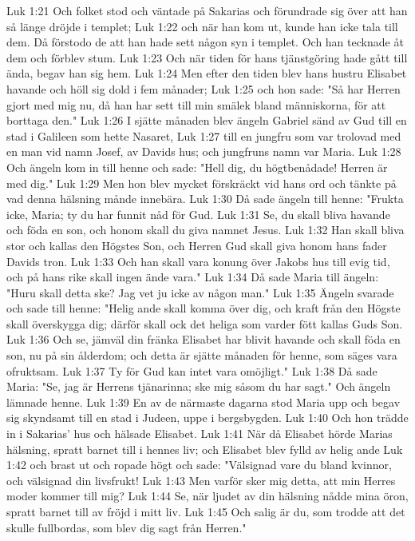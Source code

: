 Luk 1:21  Och folket stod och väntade på Sakarias och förundrade sig över att han så länge dröjde i templet;
Luk 1:22  och när han kom ut, kunde han icke tala till dem. Då förstodo de att han hade sett någon syn i templet. Och han tecknade åt dem och förblev stum.
Luk 1:23  Och när tiden för hans tjänstgöring hade gått till ända, begav han sig hem.
Luk 1:24  Men efter den tiden blev hans hustru Elisabet havande och höll sig dold i fem månader;
Luk 1:25  och hon sade: "Så har Herren gjort med mig nu, då han har sett till min smälek bland människorna, för att borttaga den."
Luk 1:26  I sjätte månaden blev ängeln Gabriel sänd av Gud till en stad i Galileen som hette Nasaret,
Luk 1:27  till en jungfru som var trolovad med en man vid namn Josef, av Davids hus; och jungfruns namn var Maria.
Luk 1:28  Och ängeln kom in till henne och sade: "Hell dig, du högtbenådade! Herren är med dig."
Luk 1:29  Men hon blev mycket förskräckt vid hans ord och tänkte på vad denna hälsning månde innebära.
Luk 1:30  Då sade ängeln till henne: "Frukta icke, Maria; ty du har funnit nåd för Gud.
Luk 1:31  Se, du skall bliva havande och föda en son, och honom skall du giva namnet Jesus.
Luk 1:32  Han skall bliva stor och kallas den Högstes Son, och Herren Gud skall giva honom hans fader Davids tron.
Luk 1:33  Och han skall vara konung över Jakobs hus till evig tid, och på hans rike skall ingen ände vara."
Luk 1:34  Då sade Maria till ängeln: "Huru skall detta ske? Jag vet ju icke av någon man."
Luk 1:35  Ängeln svarade och sade till henne: "Helig ande skall komma över dig, och kraft från den Högste skall överskygga dig; därför skall ock det heliga som varder fött kallas Guds Son.
Luk 1:36  Och se, jämväl din fränka Elisabet har blivit havande och skall föda en son, nu på sin ålderdom; och detta är sjätte månaden för henne, som säges vara ofruktsam.
Luk 1:37  Ty för Gud kan intet vara omöjligt."
Luk 1:38  Då sade Maria: "Se, jag är Herrens tjänarinna; ske mig såsom du har sagt." Och ängeln lämnade henne.
Luk 1:39  En av de närmaste dagarna stod Maria upp och begav sig skyndsamt till en stad i Judeen, uppe i bergsbygden.
Luk 1:40  Och hon trädde in i Sakarias' hus och hälsade Elisabet.
Luk 1:41  När då Elisabet hörde Marias hälsning, spratt barnet till i hennes liv; och Elisabet blev fylld av helig ande
Luk 1:42  och brast ut och ropade högt och sade: "Välsignad vare du bland kvinnor, och välsignad din livsfrukt!
Luk 1:43  Men varför sker mig detta, att min Herres moder kommer till mig?
Luk 1:44  Se, när ljudet av din hälsning nådde mina öron, spratt barnet till av fröjd i mitt liv.
Luk 1:45  Och salig är du, som trodde att det skulle fullbordas, som blev dig sagt från Herren."
